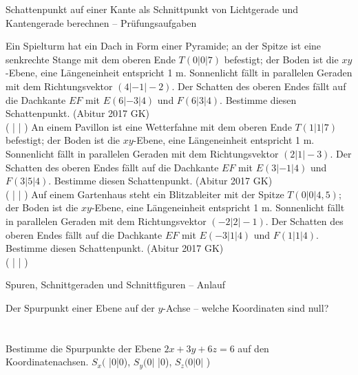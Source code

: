 \begin{aufgabe}{Schattenpunkt auf einer Kante als Schnittpunkt von Lichtgerade und Kantengerade berechnen – Prüfungsaufgaben}
\begin{teile}
\teil Ein Spielturm hat ein Dach in Form einer Pyramide; an der Spitze ist eine senkrechte Stange mit dem oberen Ende $T(0|0|7)$ befestigt; der Boden ist die $xy$-Ebene, eine Längeneinheit entspricht 1 m. Sonnenlicht fällt in parallelen Geraden mit dem Richtungsvektor $(4|-1|-2)$. Der Schatten des oberen Endes fällt auf die Dachkante $EF$ mit $E(6|-3|4)$ und $F(6|3|4)$. Bestimme diesen Schattenpunkt. \hfill (Abitur 2017 GK) \\ ( \leerfeld | \leerfeld | \leerfeld )
\teil An einem Pavillon ist eine Wetterfahne mit dem oberen Ende $T(1|1|7)$ befestigt; der Boden ist die $xy$-Ebene, eine Längeneinheit entspricht 1 m. Sonnenlicht fällt in parallelen Geraden mit dem Richtungsvektor $(2|1|-3)$. Der Schatten des oberen Endes fällt auf die Dachkante $EF$ mit $E(3|-1|4)$ und $F(3|5|4)$. Bestimme diesen Schattenpunkt. \hfill (Abitur 2017 GK) \\ ( \leerfeld | \leerfeld | \leerfeld )
\teil Auf einem Gartenhaus steht ein Blitzableiter mit der Spitze $T(0|0|4{,}5)$; der Boden ist die $xy$-Ebene, eine Längeneinheit entspricht 1 m. Sonnenlicht fällt in parallelen Geraden mit dem Richtungsvektor $(-2|2|-1)$. Der Schatten des oberen Endes fällt auf die Dachkante $EF$ mit $E(-3|1|4)$ und $F(1|1|4)$. Bestimme diesen Schattenpunkt. \hfill (Abitur 2017 GK) \\ ( \leerfeld | \leerfeld | \leerfeld )
\end{teile}
\end{aufgabe}

\begin{aufgabe}{Spuren, Schnittgeraden und Schnittfiguren – Anlauf}
\begin{teile}
\teil Der Spurpunkt einer Ebene auf der $y$-Achse – welche Koordinaten sind null? \\  \\  \\ 
\teil Bestimme die Spurpunkte der Ebene $2x + 3y + 6z = 6$ auf den Koordinatenachsen. $S_x($ \leerfeld |0|0), $S_y(0|$ \leerfeld |0), $S_z(0|0|$ \leerfeld )
\end{teile}
\end{aufgabe}

